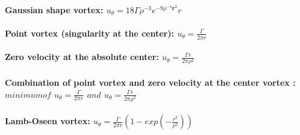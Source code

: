 \documentclass[11pt]{article}
\begin{document}
\paragraph{\texorpdfstring{Gaussian shape vortex:
\(u_\theta = 18\Gamma \rho^{-3} e^{-9 \rho^{-4} {\boldsymbol{{r}}}^{2}}r\)}{Gaussian shape vortex: u\_\textbackslash{}theta = 18\textbackslash{}Gamma \textbackslash{}rho\^{}\{-3\} e\^{}\{-9 \textbackslash{}rho\^{}\{-4\} \{\textbackslash{}boldsymbol\{\{r\}\}\}\^{}\{2\}\}r}}\label{gaussian-shape-vortex-u_theta-18gamma-rho-3-e-9-rho-4-boldsymbolr2r}

\paragraph{\texorpdfstring{Point vortex (singularity at the center):
\(u_\theta = \frac{\Gamma}{2 \pi r}\)}{Point vortex (singularity at the center): u\_\textbackslash{}theta = \textbackslash{}frac\{\textbackslash{}Gamma\}\{2 \textbackslash{}pi r\}}}\label{point-vortex-singularity-at-the-center-u_theta-fracgamma2-pi-r}

\paragraph{\texorpdfstring{Zero velocity at the absolute center:
\(u_\theta = \frac{\Gamma r}{2\pi \rho^2}\)}{Zero velocity at the absolute center: u\_\textbackslash{}theta = \textbackslash{}frac\{\textbackslash{}Gamma r\}\{2\textbackslash{}pi \textbackslash{}rho\^{}2\}}}\label{zero-velocity-at-the-absolute-center-u_theta-fracgamma-r2pi-rho2}

\paragraph{\texorpdfstring{Combination of point vortex and zero velocity
at the center vortex : \(minimum of\)
\(u_\theta = \frac{\Gamma}{2 \pi r}\) \(and\)
\(u_\theta = \frac{\Gamma r}{2\pi \rho^2}\)}{Combination of point vortex and zero velocity at the center vortex : minimum of u\_\textbackslash{}theta = \textbackslash{}frac\{\textbackslash{}Gamma\}\{2 \textbackslash{}pi r\} and u\_\textbackslash{}theta = \textbackslash{}frac\{\textbackslash{}Gamma r\}\{2\textbackslash{}pi \textbackslash{}rho\^{}2\}}}\label{combination-of-point-vortex-and-zero-velocity-at-the-center-vortex-minimum-of-u_theta-fracgamma2-pi-r-and-u_theta-fracgamma-r2pi-rho2}

\paragraph{\texorpdfstring{Lamb-Oseen vortex:
\(u_\theta = \frac{\Gamma}{2{\pi}r}\left ( 1-exp\left ( -\frac{r^2}{\rho^2} \right ) \right )\)}{Lamb-Oseen vortex: u\_\textbackslash{}theta = \textbackslash{}frac\{\textbackslash{}Gamma\}\{2\{\textbackslash{}pi\}r\}\textbackslash{}left ( 1-exp\textbackslash{}left ( -\textbackslash{}frac\{r\^{}2\}\{\textbackslash{}rho\^{}2\} \textbackslash{}right ) \textbackslash{}right )}}\label{lamb-oseen-vortex-u_theta-fracgamma2pirleft-1-expleft--fracr2rho2-right-right}
\end{document}

